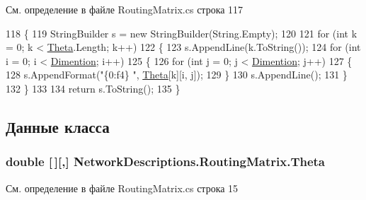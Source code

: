 См. определение в файле Routing\+Matrix.\+cs строка 117


\begin{DoxyCode}
118         \{
119             StringBuilder s = \textcolor{keyword}{new} StringBuilder(String.Empty);
120 
121             \textcolor{keywordflow}{for} (\textcolor{keywordtype}{int} k = 0; k < \hyperlink{class_network_descriptions_1_1_routing_matrix_a2524c92bfe04c3d54f1e488c6c6d3bc2}{Theta}.Length; k++)
122             \{
123                 s.AppendLine(k.ToString());
124                 \textcolor{keywordflow}{for} (\textcolor{keywordtype}{int} i = 0; i < \hyperlink{class_network_descriptions_1_1_routing_matrix_a417bebac18f3b241d4e40d55d9b44213}{Dimention}; i++)
125                 \{
126                     \textcolor{keywordflow}{for} (\textcolor{keywordtype}{int} j = 0; j < \hyperlink{class_network_descriptions_1_1_routing_matrix_a417bebac18f3b241d4e40d55d9b44213}{Dimention}; j++)
127                     \{
128                         s.AppendFormat(\textcolor{stringliteral}{"\{0:f4\} "}, \hyperlink{class_network_descriptions_1_1_routing_matrix_a2524c92bfe04c3d54f1e488c6c6d3bc2}{Theta}[k][i, j]);
129                     \}
130                     s.AppendLine();
131                 \}
132             \}
133 
134             \textcolor{keywordflow}{return} s.ToString();
135         \}
\end{DoxyCode}


\subsection{Данные класса}
\subsubsection[{\texorpdfstring{Theta}{Theta}}]{\setlength{\rightskip}{0pt plus 5cm}double \mbox{[}$\,$\mbox{]}\mbox{[},\mbox{]} Network\+Descriptions.\+Routing\+Matrix.\+Theta\hspace{0.3cm}{\ttfamily [private]}}\hypertarget{class_network_descriptions_1_1_routing_matrix_a2524c92bfe04c3d54f1e488c6c6d3bc2}{}\label{class_network_descriptions_1_1_routing_matrix_a2524c92bfe04c3d54f1e488c6c6d3bc2}


См. определение в файле Routing\+Matrix.\+cs строка 15



